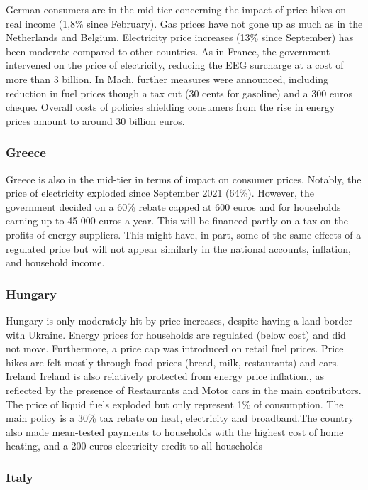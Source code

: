 \documentclass[
  9pt,
  a4paper,
  DIV=11,
  numbers=noendperiod,
  oneside]{scrartcl}
\begin{document}
German consumers are in the mid-tier concerning the impact of price
hikes on real income (1,8\% since February). Gas prices have not gone up
as much as in the Netherlands and Belgium. Electricity price increases
(13\% since September) has been moderate compared to other countries. As
in France, the government intervened on the price of electricity,
reducing the EEG surcharge at a cost of more than 3 billion. In Mach,
further measures were announced, including reduction in fuel prices
though a tax cut (30 cents for gasoline) and a 300 euros cheque. Overall
costs of policies shielding consumers from the rise in energy prices
amount to around 30 billion euros.

\hypertarget{greece}{%
\subsubsection{Greece}\label{greece}}

Greece is also in the mid-tier in terms of impact on consumer prices.
Notably, the price of electricity exploded since September 2021 (64\%).
However, the government decided on a 60\% rebate capped at 600 euros and
for households earning up to 45 000 euros a year. This will be financed
partly on a tax on the profits of energy suppliers. This might have, in
part, some of the same effects of a regulated price but will not appear
similarly in the national accounts, inflation, and household income.

\hypertarget{hungary}{%
\subsubsection{Hungary}\label{hungary}}

Hungary is only moderately hit by price increases, despite having a land
border with Ukraine. Energy prices for households are regulated (below
cost) and did not move. Furthermore, a price cap was introduced on
retail fuel prices. Price hikes are felt mostly through food prices
(bread, milk, restaurants) and cars. Ireland Ireland is also relatively
protected from energy price inflation., as reflected by the presence of
Restaurants and Motor cars in the main contributors. The price of liquid
fuels exploded but only represent 1\% of consumption. The main policy is
a 30\% tax rebate on heat, electricity and broadband.The country also
made mean-tested payments to households with the highest cost of home
heating, and a 200 euros electricity credit to all households

\hypertarget{italy}{%
\subsubsection{Italy}\label{italy}}
\end{document}

